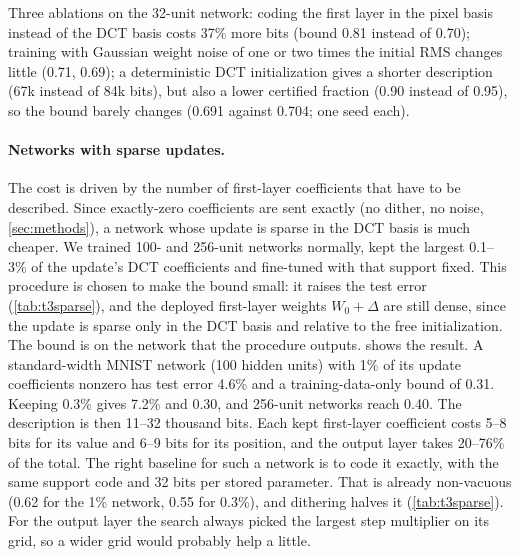 Three ablations on the 32-unit network: coding the first layer in the pixel basis instead of the DCT basis costs 37\% more bits (bound 0.81 instead of 0.70); training with Gaussian weight noise of one or two times the initial RMS changes little (0.71, 0.69); a deterministic DCT initialization gives a shorter description (67k instead of 84k bits), but also a lower certified fraction (0.90 instead of 0.95), so the bound barely changes (0.691 against 0.704; one seed each).

\paragraph{Networks with sparse updates.} The cost is driven by the number of first-layer coefficients that have to be described. Since exactly-zero coefficients are sent exactly (no dither, no noise, \cref{sec:methods}), a network whose update is sparse in the DCT basis is much cheaper. We trained 100- and 256-unit networks normally, kept the largest 0.1--3\% of the update's DCT coefficients and fine-tuned with that support fixed. This procedure is chosen to make the bound small: it raises the test error (\cref{tab:t3sparse}), and the deployed first-layer weights $W_0+\Delta$ are still dense, since the update is sparse only in the DCT basis and relative to the free initialization. The bound is on the network that the procedure outputs.  shows the result. A standard-width MNIST network (100 hidden units) with 1\% of its update coefficients nonzero has test error 4.6\% and a training-data-only bound of 0.31. Keeping 0.3\% gives 7.2\% and 0.30, and 256-unit networks reach 0.40. The description is then 11--32 thousand bits. Each kept first-layer coefficient costs 5--8 bits for its value and 6--9 bits for its position, and the output layer takes 20--76\% of the total. The right baseline for such a network is to code it exactly, with the same support code and 32 bits per stored parameter. That is already non-vacuous (0.62 for the 1\% network, 0.55 for 0.3\%), and dithering halves it (\cref{tab:t3sparse}). For the output layer the search always picked the largest step multiplier on its grid, so a wider grid would probably help a little.





